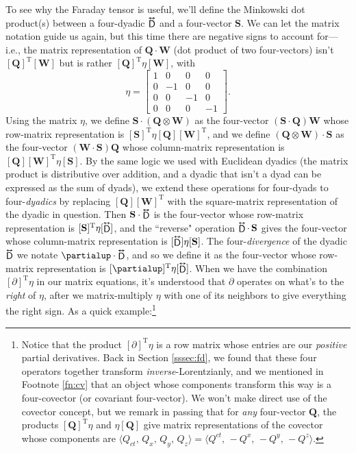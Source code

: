 \documentclass[12pt]{article}
\renewcommand{\vv}[1]{\mathbf{#1}}
\newcommand{\tightoverset}[2]{%
  \mathop{#2}\limits^{\vbox to -.5ex{\kern-0.75ex\hbox{$#1$}\vss}}}
\newcommand{\inlinedy}[1]{\tightoverset{\text{\tiny$\bm\leftrightarrow$}}{#1}}
\begin{document}
To see why the Faraday tensor is useful, we'll define the Minkowski dot product(s) between a four-dyadic $\inlinedy{\mathsf{D}}$ and a four-vector $\vv S$. We can let the matrix notation guide us again, but this time there are negative signs to account for---i.e., the matrix representation of $\vv Q \cdot \vv W$ (dot product of two four-vectors) isn't $[\vv Q]^{\textrm{T}} [\vv W]$ but is rather $[\vv Q]^{\textrm{T}} \eta [\vv W]$, with
\begin{equation}\label{eq:mmt}
\eta
=
\begin{bmatrix}
1 & 0 & 0 & 0 \\
0 & -1 & 0 & 0 \\
0 & 0 & -1 & 0 \\
0 & 0 & 0 & -1
\end{bmatrix} .
\end{equation}
Using the matrix $\eta$, we define $\vv S \cdot (\vv Q \otimes \vv W)$ as the four-vector $(\vv S \cdot \vv Q) \vv W$ whose row-matrix representation is $[\vv S]^\mathrm{T} \eta [\vv Q] [\vv W]^\mathrm{T}$, and we define $(\vv Q \otimes \vv W) \cdot \vv S$ as the four-vector $(\vv W \cdot \vv S) \vv Q$ whose column-matrix representation is $[\vv Q] [\vv W]^\mathrm{T} \eta [\vv S]$. By the same logic we used with Euclidean dyadics (the matrix product is distributive over addition, and a dyadic that isn't a dyad can be expressed as the sum of dyads), we extend these operations for four-dyads to four-\emph{dyadics} by replacing $[\vv Q][\vv W]^{\textrm{T}}$ with the square-matrix representation of the dyadic in question. Then $\vv S \cdot \inlinedy{\mathsf{D}}$ is the four-vector whose row-matrix representation is $[\vv S]^{\mathrm{T}} \eta [\inlinedy{\mathsf{D}}]$, and the ``reverse" operation $\inlinedy{\mathsf{D}} \cdot \, \vv S$ gives the four-vector whose column-matrix representation is $[\inlinedy{\mathsf{D}}] \eta [\vv S]$. The four-\emph{divergence} of the dyadic $\inlinedy{\mathsf{D}}$ we notate $\partialup \cdot \inlinedy{\mathsf{D}}$, and so we define it as the four-vector whose row-matrix representation is $[\partialup]^{\mathrm{T}} \eta [\inlinedy{\mathsf{D}}]$. When we have the combination $[\partialup]^\mathrm{T} \eta$ in our matrix equations, it's understood that $\partialup$ operates on what's to the \emph{right} of $\eta$, after we matrix-multiply $\eta$ with one of its neighbors to give everything the right sign. As a quick example:\footnote{Notice that the product $[\partialup]^\mathrm{T} \eta$ is a row matrix whose entries are our \emph{positive} partial derivatives. Back in Section \ref{sssec:fd}, we found that these four operators together transform \emph{inverse}-Lorentzianly, and we mentioned in Footnote \ref{fn:cv} that an object whose components transform this way is a four-covector (or covariant four-vector). We won't make direct use of the covector concept, but we remark in passing that for \emph{any} four-vector $\vv Q$, the products $[\vv Q]^\mathrm{T} \eta$ and $\eta [\vv Q]$ give matrix representations of the covector whose components are $\langle Q_{ct}, \, Q_x, \, Q_y, \, Q_z \rangle = \langle Q^{ct}, \, -Q^x, \, -Q^y, \, -Q^z \rangle$.}
\end{document}
